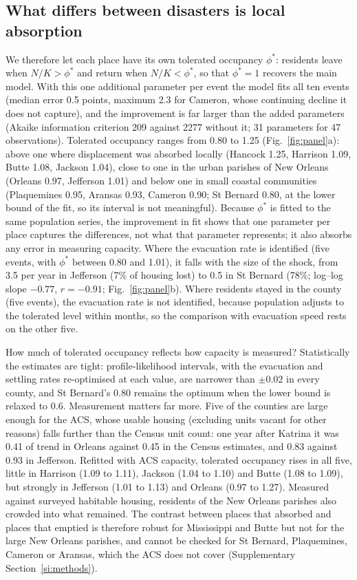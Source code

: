 \documentclass[11pt]{article}
\begin{document}
\subsection{What differs between disasters is local absorption}
We therefore let each place have its own tolerated occupancy $\phi^*$: residents leave when $N/K>\phi^*$ and return when $N/K<\phi^*$, so that $\phi^*=1$ recovers the main model. With this one additional parameter per event the model fits all ten events (median error 0.5 points, maximum 2.3 for Cameron, whose continuing decline it does not capture), and the improvement is far larger than the added parameters (Akaike information criterion 209 against 2277 without it; 31 parameters for 47 observations). Tolerated occupancy ranges from 0.80 to 1.25 (Fig.~\ref{fig:panel}a): above one where displacement was absorbed locally (Hancock 1.25, Harrison 1.09, Butte 1.08, Jackson 1.04), close to one in the urban parishes of New Orleans (Orleans 0.97, Jefferson 1.01) and below one in small coastal communities (Plaquemines 0.95, Aransas 0.93, Cameron 0.90; St Bernard 0.80, at the lower bound of the fit, so its interval is not meaningful). Because $\phi^*$ is fitted to the same population series, the improvement in fit shows that one parameter per place captures the differences, not what that parameter represents; it also absorbs any error in measuring capacity. Where the evacuation rate is identified (five events, with $\phi^*$ between 0.80 and 1.01), it falls with the size of the shock, from 3.5 per year in Jefferson (7\% of housing lost) to 0.5 in St Bernard (78\%; log--log slope $-0.77$, $r=-0.91$; Fig.~\ref{fig:panel}b). Where residents stayed in the county (five events), the evacuation rate is not identified, because population adjusts to the tolerated level within months, so the comparison with evacuation speed rests on the other five.

How much of tolerated occupancy reflects how capacity is measured? Statistically the estimates are tight: profile-likelihood intervals, with the evacuation and settling rates re-optimised at each value, are narrower than $\pm0.02$ in every county, and St Bernard's 0.80 remains the optimum when the lower bound is relaxed to 0.6. Measurement matters far more. Five of the counties are large enough for the ACS, whose usable housing (excluding units vacant for other reasons) falls further than the Census unit count: one year after Katrina it was 0.41 of trend in Orleans against 0.45 in the Census estimates, and 0.83 against 0.93 in Jefferson. Refitted with ACS capacity, tolerated occupancy rises in all five, little in Harrison (1.09 to 1.11), Jackson (1.04 to 1.10) and Butte (1.08 to 1.09), but strongly in Jefferson (1.01 to 1.13) and Orleans (0.97 to 1.27). Measured against surveyed habitable housing, residents of the New Orleans parishes also crowded into what remained. The contrast between places that absorbed and places that emptied is therefore robust for Mississippi and Butte but not for the large New Orleans parishes, and cannot be checked for St Bernard, Plaquemines, Cameron or Aransas, which the ACS does not cover (Supplementary Section~\ref{si:methods}).
\end{document}
